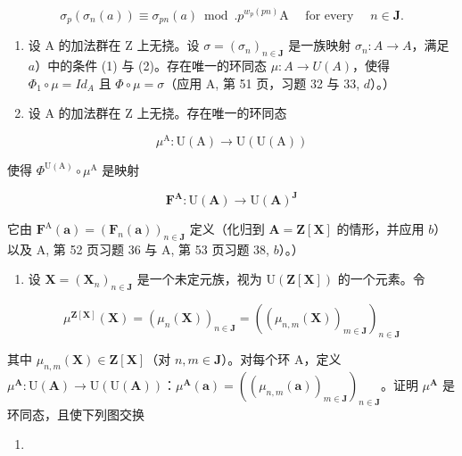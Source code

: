 \[
\sigma_ {p} \left(\sigma_ {n} (a)\right) \equiv \sigma_ {p n} (a) \bmod . p ^ {w _ {p} (p n)} \mathrm{A} \quad \text { for every } \quad n \in \mathbf {J}.
\]

\begin{enumerate}
\def\labelenumi{\alph{enumi})}
\setcounter{enumi}{1}
\item
  设 A 的加法群在 Z 上无挠。设 \(\sigma = (\sigma_n)_{n \in \mathbf{J}}\) 是一族映射 \(\sigma_n: A \to A\)，满足 \(a\)）中的条件 (1) 与 (2)。存在唯一的环同态 \(\mu: A \to U(A)\)，使得 \(\Phi_1 \circ \mu = Id_A\) 且 \(\Phi \circ \mu = \sigma\)（应用 A, 第 51 页，习题 32 与 33, \(d\)）。）
\item
  设 A 的加法群在 Z 上无挠。存在唯一的环同态
\end{enumerate}

\[
\mu^ {\mathrm{A}}: \mathrm{U} (\mathrm{A}) \rightarrow \mathrm{U} (\mathrm{U} (\mathrm{A}))
\]

使得 \(\Phi^{\mathrm{U(A)}}\circ \mu^{\mathrm{A}}\) 是映射

\[
\mathbf {F} ^ {\mathbf {A}}: \mathrm{U} (\mathbf {A}) \rightarrow \mathrm{U} (\mathbf {A}) ^ {\mathbf {J}}
\]

它由 \(\mathbf{F}^{\mathrm{A}}(\boldsymbol{a}) = (\mathbf{F}_n(\boldsymbol{a}))_{n\in \mathbf{J}}\) 定义（化归到 \(\mathbf{A} = \mathbf{Z}[\mathbf{X}]\) 的情形，并应用 \(b\)）以及 A, 第 52 页习题 36 与 A, 第 53 页习题 38, \(b\)）。）

\begin{enumerate}
\def\labelenumi{\alph{enumi})}
\setcounter{enumi}{3}
\tightlist
\item
  设 \(\mathbf{X} = (\mathbf{X}_n)_{n\in \mathbf{J}}\) 是一个未定元族，视为 \(\mathrm{U}(\mathbf{Z}[\mathbf{X}])\) 的一个元素。令
\end{enumerate}

\[
\mu^ {\mathbf {Z} [ \mathbf {X} ]} (\mathbf {X}) = \left(\mu_ {n} (\mathbf {X})\right) _ {n \in \mathbf {J}} = \left(\left(\mu_ {n, m} (\mathbf {X})\right) _ {m \in \mathbf {J}}\right) _ {n \in \mathbf {J}}
\]

其中 \(\mu_{n,m}(\mathbf{X})\in\mathbf{Z}[\mathbf{X}]\)（对 \(n,m\in\mathbf{J}\)）。对每个环 A，定义 \(\mu^{\mathbf{A}}:\mathrm{U}(\mathbf{A})\to\mathrm{U}(\mathrm{U}(\mathbf{A}))\)：\(\mu^{\mathbf{A}}(\boldsymbol{a})=(\left(\mu_{n,m}(\boldsymbol{a})\right)_{m\in\mathbf{J}})_{n\in\mathbf{J}}\)。证明 \(\mu^{\mathbf{A}}\) 是环同态，且使下列图交换

\begin{enumerate}
\def\labelenumi{(\arabic{enumi})}
\tightlist
\item
\end{enumerate}

